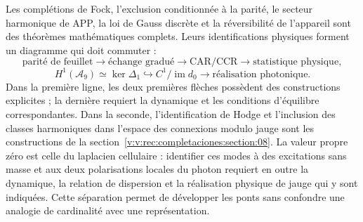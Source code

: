 Les complétions de Fock, l’exclusion conditionnée à la parité, le secteur
harmonique de APP, la loi de Gauss discrète et la réversibilité de l’appareil sont des théorèmes
mathématiques complets. Leurs identifications physiques forment un diagramme qui
doit commuter :
\[
 \text{parité de feuillet}
 \longrightarrow\text{échange gradué}
 \longrightarrow\text{CAR/CCR}
 \longrightarrow\text{statistique physique},
\]
\[
 H^1(\mathcal A_9)\simeq\ker\Delta_1
 \hookrightarrow C^1/\operatorname{im}d_0
 \longrightarrow\text{réalisation photonique}.
\]
Dans la première ligne, les deux premières flèches possèdent des constructions
explicites ; la dernière requiert la dynamique et les conditions d’équilibre
correspondantes. Dans la seconde, l’identification de Hodge et l’inclusion
des classes harmoniques dans l’espace des connexions modulo jauge sont les
constructions de la section~\ref{v:v:rec:completaciones:section:08}. La valeur propre
zéro est celle du laplacien cellulaire : identifier ces modes à des excitations
sans masse et aux deux polarisations locales du photon requiert en outre la
dynamique, la relation de dispersion et la réalisation physique de jauge qui y sont
indiquées. Cette séparation permet de développer les ponts sans confondre une
analogie de cardinalité avec une représentation.
